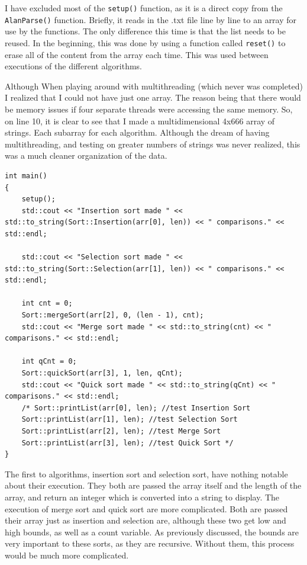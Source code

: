 \documentclass[letterpaper, 10pt]{article}
\begin{document}
I have excluded most of the \texttt{setup()} function, as it is a direct copy from the \texttt{AlanParse()} function. Briefly, it reads in the .txt file line by line to an array for use by the functions. The only difference this time is that the list needs to be reused. In the beginning, this was done by using a function called \texttt{reset()} to erase all of the content from the array each time. This was used between executions of the different algorithms.

Although When playing around with multithreading (which never was completed) I realized that I could not have just one array. The reason being that there would be memory issues if four separate threads were accessing the same memory. So, on line 10, it is clear to see that I made a multidimensional 4x666 array of strings. Each subarray for each algorithm. Although the dream of having multithreading, and testing on greater numbers of strings was never realized, this was a much cleaner organization of the data.



 \begin{addmargin}[-5em]{1em}
\begin{small}
\begin{verbatim}
int main()
{
	setup();
	std::cout << "Insertion sort made " << std::to_string(Sort::Insertion(arr[0], len)) << " comparisons." << std::endl;

	std::cout << "Selection sort made " << std::to_string(Sort::Selection(arr[1], len)) << " comparisons." << std::endl;

	int cnt = 0;
	Sort::mergeSort(arr[2], 0, (len - 1), cnt);
	std::cout << "Merge sort made " << std::to_string(cnt) << " comparisons." << std::endl;

	int qCnt = 0;
	Sort::quickSort(arr[3], 1, len, qCnt);
	std::cout << "Quick sort made " << std::to_string(qCnt) << " comparisons." << std::endl;
	/* Sort::printList(arr[0], len); //test Insertion Sort
	Sort::printList(arr[1], len); //test Selection Sort
	Sort::printList(arr[2], len); //test Merge Sort
	Sort::printList(arr[3], len); //test Quick Sort */
}
\end{verbatim}
\end{small}
\end{addmargin}

The first to algorithms, insertion sort and selection sort, have nothing notable about their execution. They both are passed the array itself and the length of the array, and return an integer which is converted into a string to display. The execution of merge sort and quick sort are more complicated. Both are passed their array just as insertion and selection are, although these two get low and high bounds, as well as a count variable. As previously discussed, the bounds are very important to these sorts, as they are recursive. Without them, this process would be much more complicated.
\end{document}
